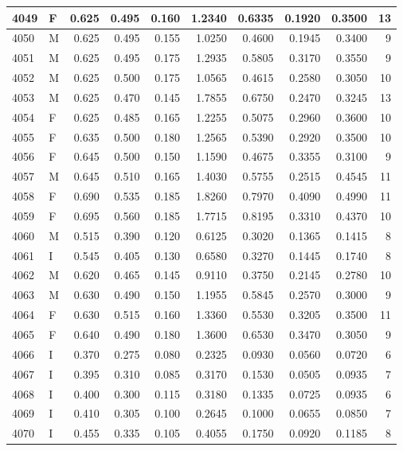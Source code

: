 \documentclass[9pt,twocolumn,twoside,]{pnas-new}
\begin{document}
\begin{tabular}{l|l|r|r|r|r|r|r|r|r}
\hline
4049 & F & 0.625 & 0.495 & 0.160 & 1.2340 & 0.6335 & 0.1920 & 0.3500 & 13\\
\hline
4050 & M & 0.625 & 0.495 & 0.155 & 1.0250 & 0.4600 & 0.1945 & 0.3400 & 9\\
\hline
4051 & M & 0.625 & 0.495 & 0.175 & 1.2935 & 0.5805 & 0.3170 & 0.3550 & 9\\
\hline
4052 & M & 0.625 & 0.500 & 0.175 & 1.0565 & 0.4615 & 0.2580 & 0.3050 & 10\\
\hline
4053 & M & 0.625 & 0.470 & 0.145 & 1.7855 & 0.6750 & 0.2470 & 0.3245 & 13\\
\hline
4054 & F & 0.625 & 0.485 & 0.165 & 1.2255 & 0.5075 & 0.2960 & 0.3600 & 10\\
\hline
4055 & F & 0.635 & 0.500 & 0.180 & 1.2565 & 0.5390 & 0.2920 & 0.3500 & 10\\
\hline
4056 & F & 0.645 & 0.500 & 0.150 & 1.1590 & 0.4675 & 0.3355 & 0.3100 & 9\\
\hline
4057 & M & 0.645 & 0.510 & 0.165 & 1.4030 & 0.5755 & 0.2515 & 0.4545 & 11\\
\hline
4058 & F & 0.690 & 0.535 & 0.185 & 1.8260 & 0.7970 & 0.4090 & 0.4990 & 11\\
\hline
4059 & F & 0.695 & 0.560 & 0.185 & 1.7715 & 0.8195 & 0.3310 & 0.4370 & 10\\
\hline
4060 & M & 0.515 & 0.390 & 0.120 & 0.6125 & 0.3020 & 0.1365 & 0.1415 & 8\\
\hline
4061 & I & 0.545 & 0.405 & 0.130 & 0.6580 & 0.3270 & 0.1445 & 0.1740 & 8\\
\hline
4062 & M & 0.620 & 0.465 & 0.145 & 0.9110 & 0.3750 & 0.2145 & 0.2780 & 10\\
\hline
4063 & M & 0.630 & 0.490 & 0.150 & 1.1955 & 0.5845 & 0.2570 & 0.3000 & 9\\
\hline
4064 & F & 0.630 & 0.515 & 0.160 & 1.3360 & 0.5530 & 0.3205 & 0.3500 & 11\\
\hline
4065 & F & 0.640 & 0.490 & 0.180 & 1.3600 & 0.6530 & 0.3470 & 0.3050 & 9\\
\hline
4066 & I & 0.370 & 0.275 & 0.080 & 0.2325 & 0.0930 & 0.0560 & 0.0720 & 6\\
\hline
4067 & I & 0.395 & 0.310 & 0.085 & 0.3170 & 0.1530 & 0.0505 & 0.0935 & 7\\
\hline
4068 & I & 0.400 & 0.300 & 0.115 & 0.3180 & 0.1335 & 0.0725 & 0.0935 & 6\\
\hline
4069 & I & 0.410 & 0.305 & 0.100 & 0.2645 & 0.1000 & 0.0655 & 0.0850 & 7\\
\hline
4070 & I & 0.455 & 0.335 & 0.105 & 0.4055 & 0.1750 & 0.0920 & 0.1185 & 8\\

\end{tabular}
\end{document}

